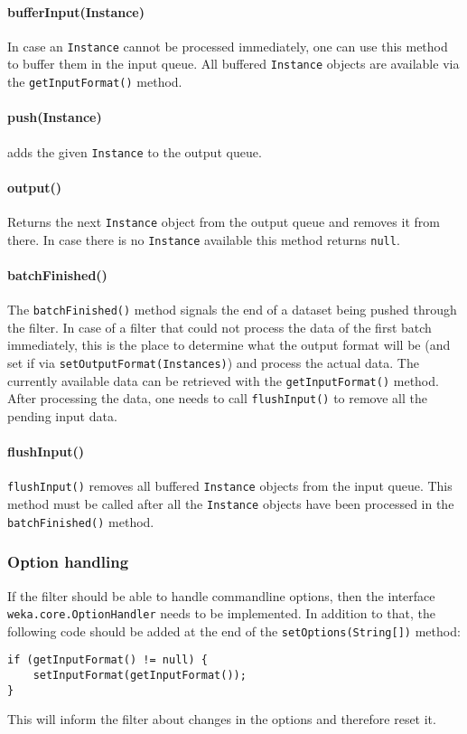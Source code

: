 \paragraph{bufferInput(Instance)}
In case an \texttt{Instance} cannot be processed immediately, one can use this
method to buffer them in the input queue. All buffered \texttt{Instance} objects
are available via the \texttt{getInputFormat()} method.

\paragraph{push(Instance)}
adds the given \texttt{Instance} to the output queue.

\paragraph{output()}
Returns the next \texttt{Instance} object from the output queue and removes it
from there. In case there is no \texttt{Instance} available this method returns
\texttt{null}.

\newpage
\paragraph{batchFinished()}
The \texttt{batchFinished()} method signals the end of a dataset being pushed
through the filter. In case of a filter that could not process the data of the
first batch immediately, this is the place to determine what the output format
will be (and set if via \texttt{setOutputFormat(Instances)}) and process the
actual data. The currently available data can be retrieved with the
\texttt{getInputFormat()} method. After processing the data, one needs to call
\texttt{flushInput()} to remove all the pending input data.

\paragraph{flushInput()}
\texttt{flushInput()} removes all buffered \texttt{Instance} objects from the
input queue. This method must be called after all the \texttt{Instance} objects
have been processed in the \texttt{batchFinished()} method.

\subsubsection*{Option handling}
If the filter should be able to handle commandline options, then the interface
\texttt{weka.core.OptionHandler} needs to be implemented. In addition
to that, the following code should be added at the end of the
\texttt{setOptions(String[])} method:
\begin{verbatim}
if (getInputFormat() != null) {
    setInputFormat(getInputFormat());
}
\end{verbatim}
This will inform the filter about changes in the options and therefore reset it.

